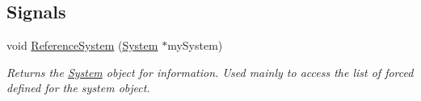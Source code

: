 \subsection*{Signals}
\begin{DoxyCompactItemize}
\item 
void \hyperlink{classosea_1_1ofreq_1_1_system_a0889e1e19fe1c0c52fd385e759e5ecc7}{Reference\-System} (\hyperlink{classosea_1_1ofreq_1_1_system}{System} $\ast$my\-System)
\begin{DoxyCompactList}\small\item\em Returns the \hyperlink{classosea_1_1ofreq_1_1_system}{System} object for information. Used mainly to access the list of forced defined for the system object. \end{DoxyCompactList}\end{DoxyCompactItemize}
